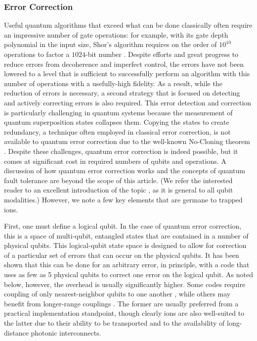 \documentclass[%
reprint,
 amsmath,amssymb,
]{revtex4-1}
\begin{document}
    \subsubsection{Error Correction}
    \label{ErrorCorrection}
Useful quantum algorithms that exceed what can be done classically often require an impressive number of gate operations: for example, with its gate depth polynomial in the input size, Shor's algorithm requires on the order of $10^{10}$ operations to factor a $1024$-bit number \cite{BeckmanEfficient1996}. Despite efforts and great progress to reduce errors from decoherence and imperfect control, the errors have not been lowered to a level that is sufficient to successfully perform an algorithm with this number of operations with a usefully-high fidelity.  As a result, while the reduction of errors is necessary, a second strategy that is focused on detecting and actively correcting errors is also required.  This error detection and correction is particularly challenging in quantum systems because the measurement of quantum superposition states collapses them.  Copying the states to create redundancy, a technique often employed in classical error correction, is not available to quantum error correction due to the well-known No-Cloning theorem \cite{WoottersNoCloning1982,DieksNoCloning1982}.  Despite these challenges, quantum error correction is indeed possible, but it comes at significant cost in required numbers of qubits and operations.  A discussion of how quantum error correction works and the concepts of quantum fault tolerance are beyond the scope of this article. (We refer the interested reader to an excellent introduction of the topic \cite{GottesmanQEC2009}, as it is general to all qubit modalities.)  However, we note a few key elements that are germane to trapped ions.

First, one must define a logical qubit. In the case of quantum error correction, this is a space of multi-qubit, entangled states that are contained in a number of physical qubits.  This logical-qubit state space is designed to allow for correction of a particular set of errors that can occur on the physical qubits.   It has been shown that this can be done for an arbitrary error, in principle, with a code that uses as few as 5 physical qubits \cite{KnillQEC1997} to correct one error on the logical qubit.  As noted below, however, the overhead is usually significantly higher.  Some codes require coupling of only nearest-neighbor qubits to one another \cite{BravyiKitaevSurfaceCode1998, FowlerSurfaceCode2012}, while others may benefit from longer-range couplings \cite{SvoreFTThresholds2006}.  The former are usually preferred from a practical implementation standpoint, though clearly ions are also well-suited to the latter due to their ability to be transported and to the availability of long-distance photonic interconnects.
\end{document}
